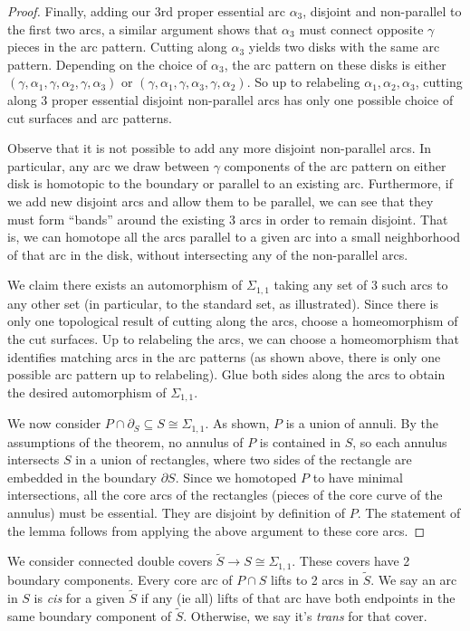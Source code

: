 \documentclass[12pt]{amsart}
\theoremstyle{definition}
\theoremstyle{remark}
\newcommand{\bd}{\partial}
\newcommand{\Si}{\Sigma}
\newcommand{\cin}{\subseteq}
\begin{document}
\begin{proof}
Finally, adding our 3rd proper essential arc $\alpha_3$, disjoint and
non-parallel to the first two arcs, a similar argument shows that $\alpha_3$
must connect opposite $\gamma$ pieces in the arc pattern. Cutting along
$\alpha_3$ yields two disks with the same arc pattern. Depending on the choice
of $\alpha_3$, the arc pattern on these disks is either
$(\gamma,\alpha_1,\gamma,\alpha_2,\gamma,\alpha_3)$ or
$(\gamma,\alpha_1,\gamma,\alpha_3,\gamma,\alpha_2)$. So up to relabeling
$\alpha_1,\alpha_2,\alpha_3$, cutting along 3 proper essential disjoint
non-parallel arcs has only one possible choice of cut surfaces and arc
patterns.

Observe that it is not possible to add any more disjoint non-parallel arcs. In
particular, any arc we draw between $\gamma$ components of the arc pattern on
either disk is homotopic to the boundary or parallel to an existing arc.
Furthermore, if we add new disjoint arcs and allow them to be parallel, we can
see that they must form ``bands'' around the existing 3 arcs in order to remain
disjoint. That is, we can homotope all the arcs parallel to a given arc into
a small neighborhood of that arc in the disk, without intersecting any of the
non-parallel arcs.

We claim there exists an automorphism of $\Si_{1,1}$ taking any set of 3 such
arcs to any other set (in particular, to the standard set, as illustrated).
Since there is only one topological result of cutting along the arcs, choose
a homeomorphism of the cut surfaces. Up to relabeling the arcs, we can choose
a homeomorphism that identifies matching arcs in the arc patterns (as shown
above, there is only one possible arc pattern up to relabeling). Glue both
sides along the arcs to obtain the desired automorphism of $\Si_{1,1}$.

We now consider $P \cap \bd_S \cin S \cong \Si_{1,1}$. As shown, $P$ is a union
of annuli. By the assumptions of the theorem, no annulus of $P$ is contained in
$S$, so each annulus intersects $S$ in a union of rectangles, where two sides
of the rectangle are embedded in the boundary $\bd S$.  Since we homotoped $P$
to have minimal intersections, all the core arcs of the rectangles (pieces of
the core curve of the annulus) must be essential. They are disjoint by
definition of $P$. The statement of the lemma follows from applying the above
argument to these core arcs.

\end{proof}

We consider connected double covers $\widetilde{S} \to S \cong \Si_{1,1}$.
These covers have 2 boundary components. Every core arc of $P \cap S$ lifts to
2 arcs in $\widetilde{S}$.  We say an arc in $S$ is \emph{cis} for a given
$\widetilde{S}$ if any (ie all) lifts of that arc have both endpoints in the
same boundary component of $\widetilde{S}$.  Otherwise, we say it's
\emph{trans} for that cover.
\end{document}
